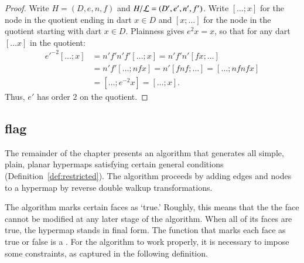 \begin{proof}  Write $H=(D,e,n,f)$ and $H/{\cal L} = (D',e',n',f')$.  
Write $[\ldots; x]$ for the node in
the quotient ending in dart $x\in D$ and $[x;\ldots]$ for the node
in the quotient starting with dart $x\in D$.  Plainness gives $e^2 x
= x$, so that for any dart $[\ldots x]$ in the quotient:
\begin{displaymath}\begin{array}{lll}
{e'}^{-2} [\ldots; x] &= n' f' n' f' [\ldots; x] = n' f' n' [f x; \ldots] \\&=
n' f' [\ldots; n f x] = n' [f n f; \ldots] = [\ldots; n f n f x]\\ &=
[\ldots; e^{-2} x] = [\ldots; x].
\end{array}\end{displaymath}
Thus, $e'$ has order $2$ on the quotient.
\end{proof}

%


\subsection{flag}
%

The remainder of the chapter presents an algorithm that generates all
simple, plain, planar hypermaps satisfying certain general conditions
(Definition~\ref{def:restricted}).  The algorithm proceeds by adding
edges and nodes to a hypermap by reverse double walkup
transformations.

The algorithm  marks certain faces as `true.'
Roughly, this  means that the the face cannot be modified
at any later stage of the algorithm.   When all of its faces
are true, the hypermap stands in final form.
The function that marks each face as true or false is a
.  For the algorithm to work properly, it is necessary
to impose some constraints, as captured in the following definition.
%

